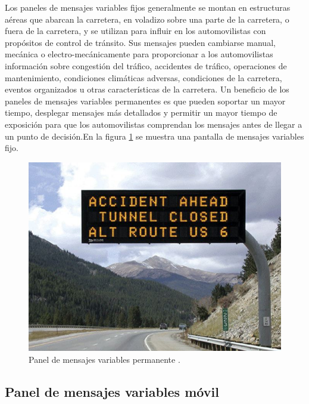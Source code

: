 Los paneles de mensajes variables fijos generalmente se montan en estructuras aéreas que abarcan la carretera, en voladizo sobre una parte de la carretera, o fuera de la carretera, y se utilizan para influir en los automovilistas con propósitos de control de tránsito. Sus mensajes pueden cambiarse manual, mecánica o electro-mecánicamente para proporcionar a los automovilistas información sobre congestión del tráfico, accidentes de tráfico, operaciones de mantenimiento, condiciones climáticas adversas, condiciones de la carretera, eventos organizados u otras características de la carretera. Un beneficio de los paneles de mensajes variables permanentes es que pueden soportar un mayor tiempo, desplegar mensajes más detallados y permitir un mayor tiempo de exposición para que los automovilistas comprendan los mensajes antes de llegar a un punto de decisión.En la figura \ref{fig:vmsp} se muestra una pantalla de mensajes variables fijo\citep{VMSTYPES}.


\begin{figure}[htpb]
	\centering
	\includegraphics[width=.9 \textwidth]{../Figures/vmspermanente.jpg} 
	\caption{Panel de mensajes variables permanente \protect\footnotemark.}
	\label{fig:vmsp}
\end{figure}






\subsection{Panel de mensajes variables móvil}

